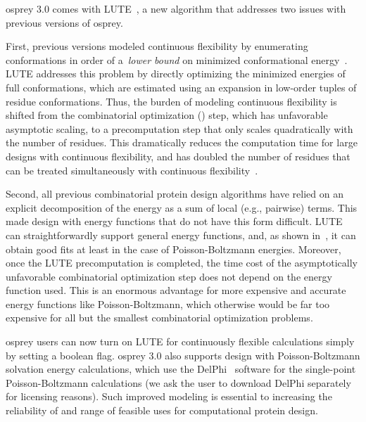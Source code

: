 {\sc osprey} 3.0 comes with LUTE~\cite{LUTE_RECOMB}, a new algorithm that addresses two issues with previous versions of {\sc osprey}.  

First, previous versions modeled continuous flexibility by enumerating conformations in order of a~\textit{lower bound} on minimized conformational energy~\cite{minDEE,iMinDEE}. LUTE addresses this problem by directly optimizing the minimized energies of full conformations, which are estimated using an expansion in low-order tuples of residue conformations.  Thus, the burden of modeling continuous flexibility is shifted from the combinatorial optimization (\as) step, which has unfavorable asymptotic scaling, to a precomputation step that only scales quadratically with the number of residues. This dramatically reduces the computation time for large designs with continuous flexibility, and has doubled the number of residues that can be treated simultaneously with continuous flexibility~\cite{LUTE_RECOMB}.    

Second, all previous combinatorial protein design algorithms have relied on an explicit decomposition of the energy as a sum of local (e.g., pairwise) terms.  This made design with energy functions that do not have this form difficult. LUTE can straightforwardly support general energy functions, and, as shown in~\cite{LUTE_RECOMB}, it can obtain good fits at least in the case of Poisson-Boltzmann energies.  Moreover, once the LUTE precomputation is completed, the time cost of the asymptotically unfavorable combinatorial optimization step does not depend on the energy function used.  This is an enormous advantage for more expensive and accurate energy functions like Poisson-Boltzmann, which otherwise would be far too expensive for all but the smallest combinatorial optimization problems.  

{\sc osprey} users can now turn on LUTE for continuously flexible calculations simply by setting a boolean flag. 
{\sc osprey} 3.0 also supports design with Poisson-Boltzmann solvation energy calculations, which use the DelPhi~\cite{OSOR,DelPhi_surface} software for the single-point Poisson-Boltzmann calculations (we ask the user to download DelPhi separately for licensing reasons). Such improved modeling is essential to increasing the reliability of and range of feasible uses for computational protein design.  